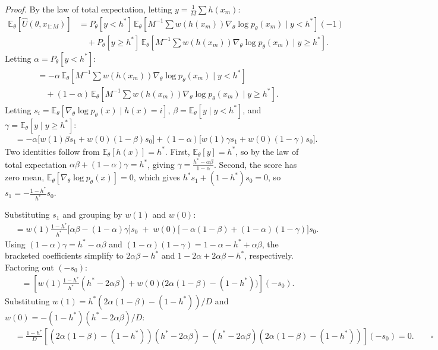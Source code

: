 \documentclass{article}
\begin{document}
\textit{Proof.} By the law of total expectation, letting $y = \frac{1}{M}\sum h(x_m)$:
\begin{align*}
\mathbb{E}_{\theta}[\hat U(\theta, x_{1:M})]
    &= P_\theta[y < h^*]\, \mathbb{E}_\theta\!\left[M^{-1}\sum w(h(x_m))\nabla_\theta \log p_\theta(x_m) \mid y < h^*\right](-1) \\
    &\quad + P_\theta[y \ge h^*]\, \mathbb{E}_\theta\!\left[M^{-1}\sum w(h(x_m))\nabla_\theta \log p_\theta(x_m) \mid y \ge h^*\right].
\end{align*}
Letting $\alpha = P_\theta[y < h^*]$:
\begin{align*}
    &= -\alpha\, \mathbb{E}_\theta\!\left[M^{-1}\sum w(h(x_m))\nabla_\theta \log p_\theta(x_m) \mid y < h^*\right] \\
    &\quad + (1-\alpha)\, \mathbb{E}_\theta\!\left[M^{-1}\sum w(h(x_m))\nabla_\theta \log p_\theta(x_m) \mid y \ge h^*\right].
\end{align*}
Letting $s_i = \mathbb{E}_\theta[\nabla_\theta \log p_\theta(x) \mid h(x) = i]$, $\beta = \mathbb{E}_\theta[y \mid y < h^*]$, and $\gamma = \mathbb{E}_\theta[y \mid y \ge h^*]$:
\begin{align*}
    &= -\alpha\big[w(1)\beta s_1 + w(0)(1-\beta)s_0\big] + (1-\alpha)\big[w(1)\gamma s_1 + w(0)(1-\gamma)s_0\big].
\end{align*}
Two identities follow from $\mathbb{E}_\theta[h(x)] = h^*$. First, $\mathbb{E}_\theta[y] = h^*$, so by the law of total expectation $\alpha\beta + (1-\alpha)\gamma = h^*$, giving $\gamma = \frac{h^*-\alpha\beta}{1-\alpha}$. Second, the score has zero mean, $\mathbb{E}_\theta[\nabla_\theta \log p_\theta(x)] = 0$, which gives $h^* s_1 + (1-h^*)s_0 = 0$, so $s_1 = -\frac{1-h^*}{h^*}s_0$.

Substituting $s_1$ and grouping by $w(1)$ and $w(0)$:
\begin{align*}
    &= w(1)\frac{1-h^*}{h^*}\bigl[\alpha\beta - (1-\alpha)\gamma\bigr]s_0 \;+\; w(0)\bigl[-\alpha(1-\beta) + (1-\alpha)(1-\gamma)\bigr]s_0.
\end{align*}
Using $(1-\alpha)\gamma = h^*-\alpha\beta$ and $(1-\alpha)(1-\gamma)=1-\alpha-h^*+\alpha\beta$, the bracketed coefficients simplify to $2\alpha\beta - h^*$ and $1-2\alpha+2\alpha\beta-h^*$, respectively. Factoring out $(-s_0)$:
\begin{align*}
    &= \left[w(1)\frac{1-h^*}{h^*}(h^*-2\alpha\beta) + w(0)\bigl(2\alpha(1-\beta)-(1-h^*)\bigr)\right](-s_0).
\end{align*}
Substituting $w(1) = h^*(2\alpha(1-\beta)-(1-h^*))/D$ and $w(0) = -(1-h^*)(h^*-2\alpha\beta)/D$:
\begin{align*}
    &= \frac{1-h^*}{D}\left[(2\alpha(1-\beta)-(1-h^*))(h^*-2\alpha\beta) - (h^*-2\alpha\beta)(2\alpha(1-\beta)-(1-h^*))\right](-s_0) = 0.\qquad\square
\end{align*}
\end{document}
